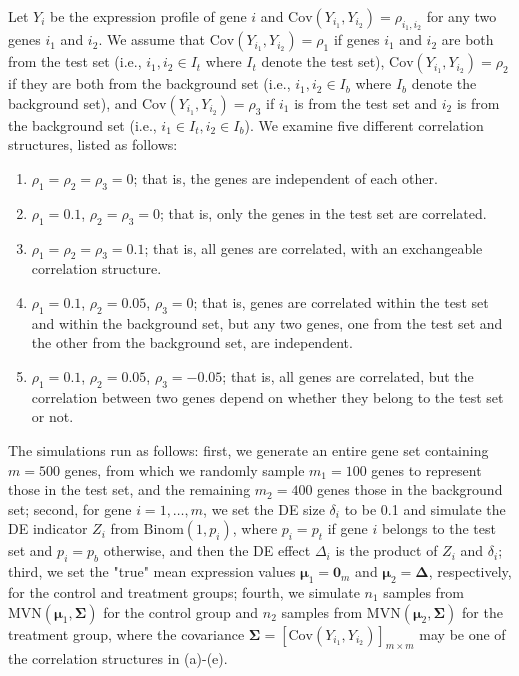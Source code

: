 \documentclass[useAMS,usenatbib, galley]{biom}
\newcommand{\aaCase}{a}
\newcommand{\aCase}{b}
\newcommand{\cCase}{c}
\newcommand{\eCase}{d}
\newcommand{\fCase}{e}
\begin{document}
	Let $Y_{i}$ be the expression profile of gene $i$ and $\text{Cov}(Y_{i_1}, Y_{i_2})=\rho_{i_1, i_2}$ for any two genes $i_1$ and $i_2$. We assume that $\text{Cov}(Y_{i_1}, Y_{i_2})= \rho_1$ if genes $i_1$ and $i_2$ are both from the test set (i.e., $i_1, i_2 \in I_t$ where $I_t$ denote the test set),  $\text{Cov}(Y_{i_1}, Y_{i_2}) =\rho_2$ if they are both from the background set (i.e.,  $ i_1, i_2\in I_b$ where $I_b$ denote the background set), and  $\text{Cov}(Y_{i_1}, Y_{i_2})= \rho_3$ if $i_1$ is from the test set and $i_2$ is from the background set (i.e., $i_1\in I_t, i_2\in I_b$). We examine five different correlation structures, listed as follows:
	
		\begin{enumerate}
			\item[(\aaCase):] $\rho_1 = \rho_2 = \rho_3 = 0$; that is, the genes are independent of each other.
			\item[(\aCase):] $\rho_1 = 0.1$, $\rho_2 = \rho_3 = 0$; that is, only the genes in the test set are correlated.
			\item[(\cCase):] $\rho_1 = \rho_2 = \rho_3 = 0.1$; that is, all genes are correlated, with an exchangeable correlation structure. 
			\item[(\eCase):] $\rho_1 = 0.1$, $\rho_2 = 0.05$, $\rho_3 = 0$; that is, 
			 genes are correlated within the test set and within the background set, but any two genes, one from the test set and the other from the background set, are independent.
			\item[(\fCase):] $\rho_1 = 0.1$, $\rho_2 = 0.05$, $\rho_3 = -0.05$; that is, all genes are correlated, but the correlation between two genes depend on whether they belong to the test set or not.
		\end{enumerate}
		
		The simulations run as follows: first, we generate an entire gene set containing $m=500$ genes, from which we randomly sample $m_1 = 100$ genes to represent those in the test set, and the remaining $m_2=400$ genes those in the background set; second, for gene $i=1, \ldots, m$, we set the DE size $\delta_i$ to be 0.1 and simulate the DE indicator $Z_i$ from $\text{Binom}(1, p_i)$,  where $p_i= p_t$ if gene $i$ belongs to the test set and $p_i = p_b$  otherwise, and then the DE effect $\Delta_i$ is the product of $Z_i$ and $\delta_i$; third, we set the "true" mean expression values $\bm \mu_1 = \bm 0_m$ and $\bm \mu_2 = \bm \Delta$, respectively,  for the control and treatment groups; fourth, we simulate $n_1$ samples from $\text{MVN}(\bm \mu_1, \bm \Sigma)$ for the control group and $n_2$ samples from $\text{MVN}(\bm \mu_2, \bm \Sigma)$ for the treatment group, where the covariance $\bm \Sigma = \left[\text{Cov}(Y_{i_1}, Y_{i_2})\right]_{m\times m}$ may be one of the correlation structures in (\aaCase)-(\fCase).
	
\end{document}
